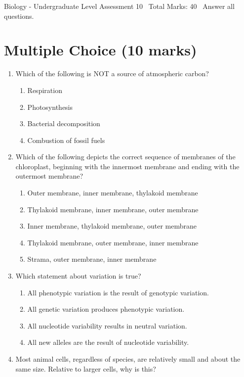 \documentclass[12pt]{article}
\begin{document}
\begin{center}
Biology - Undergraduate Level Assessment 10 \
Total Marks: 40 \
Answer all questions.
\end{center}

\section*{Multiple Choice (10 marks)}
\begin{enumerate}[label=\arabic*.]
\item Which of the following is NOT a source of atmospheric carbon?
\begin{enumerate}[label=(\alph*)]
    \item Respiration
    \item Photosynthesis
    \item Bacterial decomposition
    \item Combustion of fossil fuels
\end{enumerate}
\item Which of the following depicts the correct sequence of membranes of the chloroplast, beginning with the innermost membrane and ending with the outermost membrane?
\begin{enumerate}[label=(\alph*)]
    \item Outer membrane, inner membrane, thylakoid membrane
    \item Thylakoid membrane, inner membrane, outer membrane
    \item Inner membrane, thylakoid membrane, outer membrane
    \item Thylakoid membrane, outer membrane, inner membrane
    \item Strama, outer membrane, inner membrane
\end{enumerate}
\item Which statement about variation is true?
\begin{enumerate}[label=(\alph*)]
    \item All phenotypic variation is the result of genotypic variation.
    \item All genetic variation produces phenotypic variation.
    \item All nucleotide variability results in neutral variation.
    \item All new alleles are the result of nucleotide variability.
\end{enumerate}
\item Most animal cells, regardless of species, are relatively small and about the same size. Relative to larger cells, why is this?

\end{enumerate}
\end{document}
